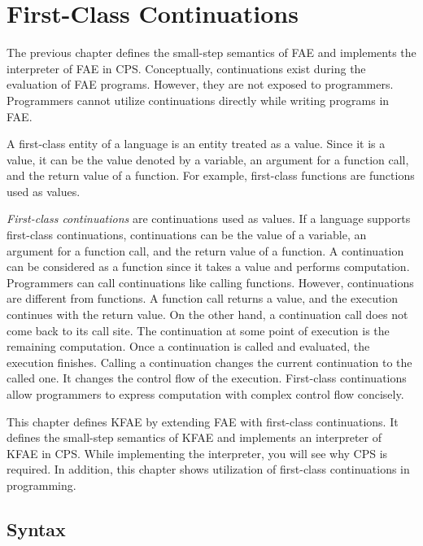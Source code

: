 \setchapterpreamble[u]{\margintoc}
\chapter{First-Class Continuations}

\renewcommand{\plang}{\textsf{FAE}\xspace}
\renewcommand{\lang}{\textsf{KFAE}\xspace}

The previous chapter defines the small-step semantics of \plang and implements
the interpreter of \plang in CPS. Conceptually,
continuations exist during the evaluation of \plang programs. However, they are
not exposed to programmers. Programmers cannot utilize continuations directly while
writing programs in \plang.

A first-class entity of a language is an entity treated as a
value. Since it is a value, it can be the value denoted by a variable, an argument for a
function call, and the return value of a function. For example, first-class
functions are functions used as values.

\textit{First-class continuations}
are continuations used as values. If a language
supports first-class continuations, continuations can be the value of a variable,
an argument for a function call, and the return value of a function. A
continuation can be considered as a function since it takes a value and performs
computation. Programmers can call continuations like calling functions. However,
continuations are different from functions. A function call returns a value, and
the execution continues with the return value. On the other hand, a continuation
call does not come back to its call site. The continuation at some point of execution
is the remaining computation. Once a continuation is called and evaluated,
the execution finishes. Calling a continuation changes the
current continuation to the called one. It changes the control flow of the
execution. First-class continuations allow programmers to express
computation with complex control flow concisely.

This chapter defines \lang by extending \plang with first-class continuations.
It defines the small-step semantics of \lang and implements an interpreter of
\lang in CPS. While implementing the interpreter, you will see why CPS is required.
In addition, this chapter shows utilization of first-class continuations in
programming.

\section{Syntax}

